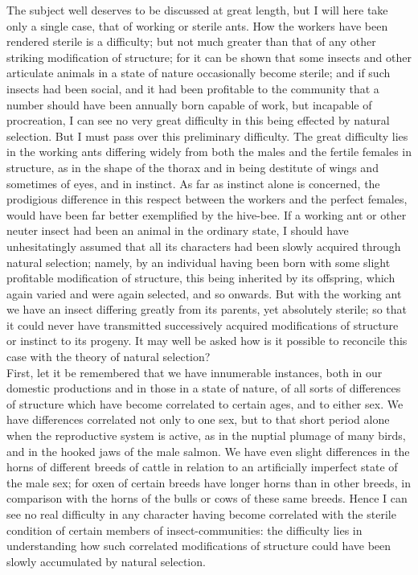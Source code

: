 \indent The subject well deserves to be discussed at great length, but I will here take only a single case, that of working or sterile ants.  How the workers have been rendered sterile is a difficulty; but not much greater than that of any other striking modification of structure; for it can be shown that some insects and other articulate animals in a state of nature occasionally become sterile; and if such insects had been social, and it had been profitable to the community that a number should have been annually born capable of work, but incapable of procreation, I can see no very great difficulty in this being effected by natural selection. But I must pass over this preliminary difficulty.  The great difficulty lies in the working ants differing widely from both the males and the fertile females in structure, as in the shape of the thorax and in being destitute of wings and sometimes of eyes, and in instinct.  As far as instinct alone is concerned, the prodigious difference in this respect between the workers and the perfect females, would have been far better exemplified by the hive-bee. If a working ant or other neuter insect had been an animal in the ordinary state, I should have unhesitatingly assumed that all its characters had been slowly acquired through natural selection; namely, by an individual having been born with some slight profitable modification of structure, this being inherited by its offspring, which again varied and were again selected, and so onwards. But with the working ant we have an insect differing greatly from its parents, yet absolutely sterile; so that it could never have transmitted successively acquired modifications of structure or instinct to its progeny. It may well be asked how is it possible to reconcile this case with the theory of natural selection?\\
\indent First, let it be remembered that we have innumerable instances, both in our domestic productions and in those in a state of nature, of all sorts of differences of structure which have become correlated to certain ages, and to either sex. We have differences correlated not only to one sex, but to that short period alone when the reproductive system is active, as in the nuptial plumage of many birds, and in the hooked jaws of the male salmon. We have even slight differences in the horns of different breeds of cattle in relation to an artificially imperfect state of the male sex; for oxen of certain breeds have longer horns than in other breeds, in comparison with the horns of the bulls or cows of these same breeds. Hence I can see no real difficulty in any character having become correlated with the sterile condition of certain members of insect-communities: the difficulty lies in understanding how such correlated modifications of structure could have been slowly accumulated by natural selection.\\
